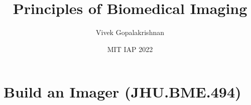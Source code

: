 \documentclass[letter,twoside,openany]{tufte-book}
\title[(HST.164) Principles of Biomedical Imaging]{Principles of Biomedical Imaging}
\author{Vivek Gopalakrishnan}
\date{MIT IAP 2022}
\begin{document}
\maketitle
\tableofcontents
\newpage



\part{Build an Imager (JHU.BME.494)}



\end{document}
